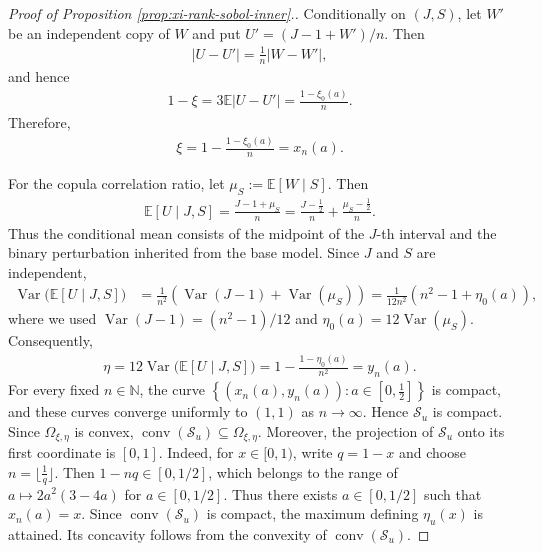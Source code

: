 \documentclass{article}
\newcommand{\Var}{\operatorname{Var}}
\newcommand{\E}{\mathbb{E}}
\newcommand{\N}{\mathbb{N}}
\begin{document}
\begin{proof}[Proof of Proposition \ref{prop:xi-rank-sobol-inner}.]
Conditionally on \((J,S)\), let \(W'\) be an independent copy of \(W\)
and put
\(
U'=(J-1+W')/n.
\)
Then
\begin{align*}
    |U-U'|
    =
    \frac{1}{n}|W-W'|,
\end{align*}
and hence
\begin{align*}
    1-\xi
    =
    3\E|U-U'|
    =
    \frac{1-\xi_0(a)}{n}.
\end{align*}
Therefore,
\begin{align*}
    \xi
    =
    1-\frac{1-\xi_0(a)}{n}
    =
    x_n(a).
\end{align*}

For the copula correlation ratio, let
\(
\mu_S:=\E[W\mid S].
\)
Then
\begin{align*}
    \E[U\mid J,S]
    =
    \frac{J-1+\mu_S}{n}
    =
    \frac{J-\frac12}{n}
    +
    \frac{\mu_S-\frac12}{n}.
\end{align*}
Thus the conditional mean consists of the midpoint of the \(J\)-th interval and the binary perturbation inherited from the base model.
Since \(J\) and \(S\) are independent,
\begin{align*}
    \Var\bigl(\E[U\mid J,S]\bigr)
    &=
    \frac{1}{n^2}
    \left(
        \Var(J-1)+\Var(\mu_S)
    \right)
    =
    \frac{1}{12n^2}
    \left(
        n^2-1+\eta_0(a)
    \right),
\end{align*}
where we used
\(
\Var(J-1)=(n^2-1)/12
\)
and
\(
\eta_0(a)=12\Var(\mu_S).
\)
Consequently,
\begin{align*}
    \eta
    =
    12\Var\bigl(\E[U\mid J,S]\bigr)
    =
    1-\frac{1-\eta_0(a)}{n^2}
    =
    y_n(a).
\end{align*}
For every fixed \(n\in\N\), the curve
\(   \left\{
        (x_n(a),y_n(a)):a\in[0,\tfrac12]
    \right\}
\)
is compact, and these curves converge uniformly to \((1,1)\) as \(n\to\infty\).
Hence \(\mathcal S_{u}\) is compact.
Since \(\Omega_{\xi,\eta}\) is convex,
\(\operatorname{conv}(\mathcal S_{u})
    \subseteq
    \Omega_{\xi,\eta}.
\)
Moreover, the projection of \(\mathcal S_{u}\) onto its first coordinate is \([0,1]\).
Indeed, for \(x\in [0,1)\), write \(q=1-x\) and choose \(n=\lfloor\tfrac1q\rfloor\).
Then \(1-nq\in[0,1/2]\), which belongs to the range of \(a\mapsto2a^2(3-4a)\) for \(a\in [0,1/2]\).
Thus there exists \(a\in[0,1/2]\) such that \(x_n(a)=x\).
Since \(\operatorname{conv}(\mathcal S_u)\) is compact, the maximum defining \(\eta_u(x)\) is attained.
Its concavity follows from the convexity of \(\operatorname{conv}(\mathcal S_{u})\).


\end{proof}
\end{document}
